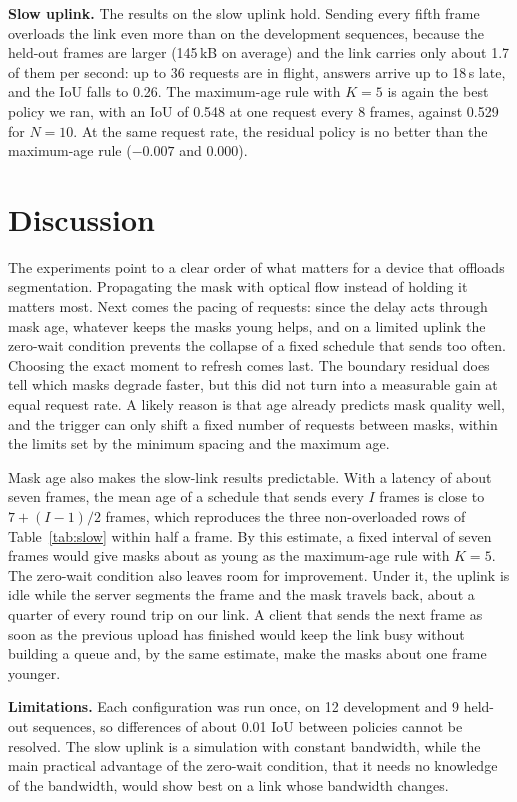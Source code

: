 \documentclass[conference]{IEEEtran}
\begin{document}
\textbf{Slow uplink.} The results on the slow uplink hold. Sending every fifth frame overloads the link even more than on the development sequences, because the held-out frames are larger (145\,kB on average) and the link carries only about 1.7 of them per second: up to 36 requests are in flight, answers arrive up to 18\,s late, and the IoU falls to 0.26. The maximum-age rule with $K=5$ is again the best policy we ran, with an IoU of 0.548 at one request every 8 frames, against 0.529 for $N=10$. At the same request rate, the residual policy is no better than the maximum-age rule ($-0.007$ and $0.000$).

\section{Discussion}
\label{sec:discussion}

The experiments point to a clear order of what matters for a device that offloads segmentation. Propagating the mask with optical flow instead of holding it matters most. Next comes the pacing of requests: since the delay acts through mask age, whatever keeps the masks young helps, and on a limited uplink the zero-wait condition prevents the collapse of a fixed schedule that sends too often. Choosing the exact moment to refresh comes last. The boundary residual does tell which masks degrade faster, but this did not turn into a measurable gain at equal request rate. A likely reason is that age already predicts mask quality well, and the trigger can only shift a fixed number of requests between masks, within the limits set by the minimum spacing and the maximum age.

Mask age also makes the slow-link results predictable. With a latency of about seven frames, the mean age of a schedule that sends every $I$ frames is close to $7 + (I-1)/2$ frames, which reproduces the three non-overloaded rows of Table~\ref{tab:slow} within half a frame. By this estimate, a fixed interval of seven frames would give masks about as young as the maximum-age rule with $K=5$. The zero-wait condition also leaves room for improvement. Under it, the uplink is idle while the server segments the frame and the mask travels back, about a quarter of every round trip on our link. A client that sends the next frame as soon as the previous upload has finished would keep the link busy without building a queue and, by the same estimate, make the masks about one frame younger.

\textbf{Limitations.} Each configuration was run once, on 12 development and 9 held-out sequences, so differences of about 0.01 IoU between policies cannot be resolved. The slow uplink is a simulation with constant bandwidth, while the main practical advantage of the zero-wait condition, that it needs no knowledge of the bandwidth, would show best on a link whose bandwidth changes.
\end{document}
